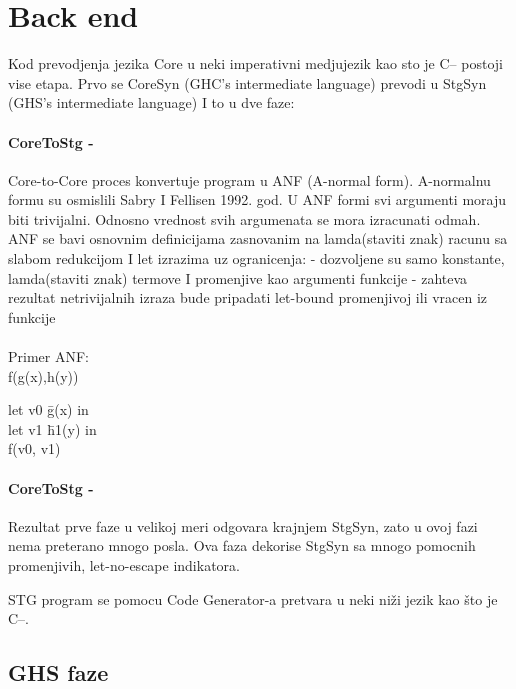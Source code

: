 \section{Back end}
\label{sec:backend}
\label{slike_i_tabele}


Kod prevodjenja jezika Core u neki imperativni medjujezik kao sto je C-- postoji vise etapa.
Prvo se CoreSyn (GHC’s intermediate language) prevodi u StgSyn (GHS’s intermediate language) I to u dve faze:


\paragraph{CoreToStg - }

Core-to-Core proces konvertuje program u ANF (A-normal form). A-normalnu formu su osmislili Sabry I Fellisen 1992. god.  U ANF formi svi argumenti moraju biti trivijalni. Odnosno  vrednost svih argumenata se mora izracunati odmah. ANF se bavi osnovnim definicijama zasnovanim na lamda(staviti znak) racunu sa slabom redukcijom I let izrazima uz ogranicenja:
- dozvoljene su samo konstante, lamda(staviti znak) termove I promenjive kao argumenti funkcije
- zahteva rezultat netrivijalnih izraza bude pripadati let-bound promenjivoj ili vracen iz funkcije \\ \\
Primer ANF: \\ f(g(x),h(y))\\

\begin{tabbing}
let v0 \= g(x) in \\
	\>let v1 \= h1(y) in \\
	\> \> f(v0, v1)
\end{tabbing}

\paragraph{CoreToStg - }

Rezultat prve faze u velikoj meri odgovara krajnjem StgSyn, zato u ovoj fazi nema preterano mnogo posla. Ova faza dekorise StgSyn sa mnogo pomocnih  promenjivih, let-no-escape indikatora.

STG program se pomocu  Code Generator-a pretvara u neki niži jezik kao što je C--.

\subsection{GHS faze}

